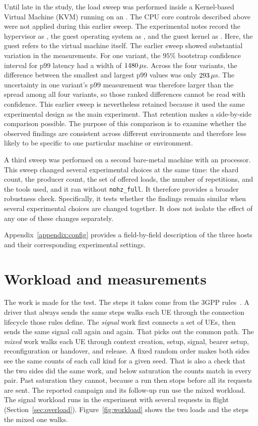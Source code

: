 \documentclass[english,oneside,a4paper,censored,csm,software-track-2020]{HYthesisML}
\begin{document}
Until late in the study, the load sweep was performed inside a
Kernel-based Virtual Machine (KVM) running on an \GuestCpu{}. The CPU core
controls described above were not applied during this earlier sweep. The
experimental notes record the hypervisor as \GuestVirt{}, the guest
operating system as \GuestDistro{}, and the guest kernel as \GuestKernel{}.
Here, the guest refers to the virtual machine itself. The earlier sweep showed
substantial variation in the measurements. For one
variant, the $95\%$ bootstrap confidence interval for p99 latency had a
width of $1480\,\mu$s. Across the four variants, the
difference between the smallest and largest p99 values was only
$293\,\mu$s. The uncertainty in one variant's p99 measurement was
therefore larger than the spread among all four variants, so those ranked differences
cannot be read with confidence. This earlier sweep is nevertheless retained because it used the same
experimental design as the main experiment. That retention makes a
side-by-side comparison possible. The purpose of this comparison is to examine
whether the observed findings are consistent across different environments
and therefore less likely to be specific to one particular machine or
environment.

A third sweep was performed on a second bare-metal machine with an
\BmCpu{} processor. This sweep changed several experimental choices at
the same time: the shard count, the producer count, the set of offered loads,
the number of repetitions, and the tools used, and it ran without
\texttt{nohz\_full}. It therefore provides a broader
robustness check. Specifically, it tests whether the findings remain
similar when several experimental choices are changed together. It does
not isolate the effect of any one of these changes
separately.

Appendix~\ref{appendix:config} provides a field-by-field description of
the three hosts and their corresponding experimental settings.

\section[Workload and measurements]{Workload and measurements\label{sec:workload}}
The work is made for the test. The steps it takes come from the 3GPP
rules~\cite{3gpp38401,3gpp38331}. A driver that always sends the same
steps walks each UE through the connection lifecycle those rules
define. The \emph{signal} work first connects a set of UEs, then sends the
same signal call again and again. That picks out the common path. The
\emph{mixed} work walks each UE through context creation, setup,
signal, bearer setup, reconfiguration or handover, and release. A fixed
random order makes both sides see the same counts of each call kind
for a given seed. That is also a check that the two sides did the same
work, and below saturation the counts match in every pair. Past saturation they
cannot, because a run then stops before all its requests are sent. The reported
campaign and its follow-up run use the mixed workload. The signal workload runs
in the experiment with several requests in flight (Section~\ref{sec:overload}).
Figure~\ref{fig:workload} shows the two loads and the steps the mixed one walks.
\end{document}
